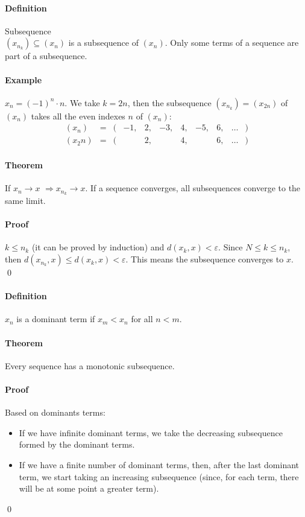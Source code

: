 \documentclass{article}
\newcommand{\Ep}{\varepsilon}
\newcommand{\Def}{\paragraph{Definition}}
\newcommand{\Theorem}{\paragraph{Theorem}}
\newcommand{\Proof}{\paragraph{Proof}}
\newcommand{\Example}{\paragraph{Example}}
\begin{document}
  \Def Subsequence
\\$(x_{n_k}) \subseteq (x_n)$ is a subsequence of $(x_n)$. Only some terms of a
  sequence are part of a subsequence.

  \Example $x_n = (-1)^n \cdot n$. We take $k = 2n$, then the subsequence
  $(x_{n_k}) = (x_{2n})$ of $(x_n)$ takes all the even indexes $n$ of $(x_n)$:
  \begin{equation*}
    \begin{array}{lcrcccccccl}
      (x_n)		& = & ( & -1, & 2, & -3, & 4, & -5, & 6, & \hdots & )\\
      (x_2n)	& = & ( & 		& 2, &		 & 4, &			& 6, & \hdots & )
    \end{array}
  \end{equation*}

  \Theorem If $x_n \to x$ $\Rightarrow x_{n_k} \to x$. If a sequence converges,
  all subsequences converge to the same limit.

  \Proof $k \leq n_k$ (it can be proved by induction) and $d(x_k,x) < \Ep$.
  Since $N \leq k \leq n_k$, then $d(x_{n_k},x) \leq d(x_k,x) < \Ep$. This
  means the subsequence converges to $x$.
\\\qed

  \Def $x_n$ is a dominant term if $x_m < x_n$ for all $n < m$.

  \Theorem Every sequence has a monotonic subsequence.

  \Proof Based on dominants terms:
  \begin{itemize}
    \item If we have infinite dominant terms, we take the decreasing subsequence
    formed by the dominant terms.
    \item If we have a finite number of dominant terms, then, after the last
    dominant term, we start taking an increasing subsequence (since, for each
    term, there will be at some point a greater term).
  \end{itemize}
  \qed
\end{document}
